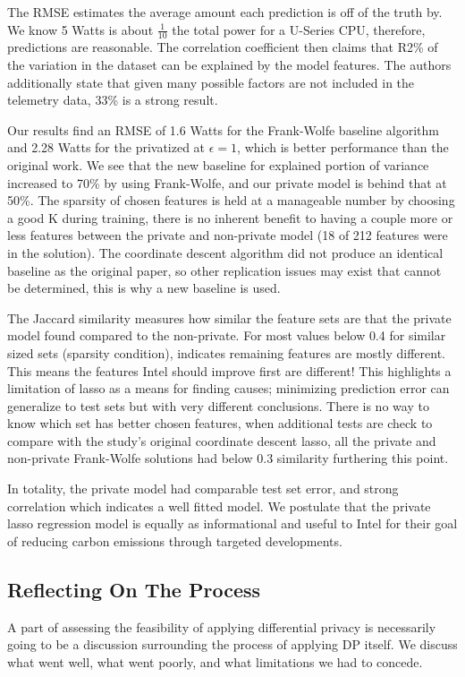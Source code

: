 \documentclass[12pt,letterpaper]{article}
\begin{document}
The RMSE estimates the average amount each prediction is off of the truth by. We know 5 Watts is about $\frac{1}{10}$ the total power for a U-Series CPU, therefore, predictions are reasonable. The correlation coefficient then claims that R2\% of the variation in the dataset can be explained by the model features. The authors additionally state that given many possible factors are not included in the telemetry data, 33\% is a strong result.

Our results find an RMSE of 1.6 Watts for the Frank-Wolfe baseline algorithm and 2.28 Watts for the privatized at $\epsilon=1$, which is better performance than the original work. We see that the new baseline for explained portion of variance increased to 70\% by using Frank-Wolfe, and our private model is behind that at 50\%. The sparsity of chosen features is held at a manageable number by choosing a good K during training, there is no inherent benefit to having a couple more or less features between the private and non-private model (18 of 212 features were in the solution). The coordinate descent algorithm did not produce an identical baseline as the original paper, so other replication issues may exist that cannot be determined, this is why a new baseline is used.

The Jaccard similarity measures how similar the feature sets are that the private model found compared to the non-private. For most values below 0.4 for similar sized sets (sparsity condition), indicates remaining features are mostly different. This means the features Intel should improve first are different! This highlights a limitation of lasso as a means for finding causes; minimizing prediction error can generalize to test sets but with very different conclusions. There is no way to know which set has better chosen features, when additional tests are check to compare with the study’s original coordinate descent lasso, all the private and non-private Frank-Wolfe solutions had below 0.3 similarity furthering this point.

In totality, the private model had comparable test set error, and strong correlation which indicates a well fitted model. We postulate that the private lasso regression model is equally as informational and useful to Intel for their goal of reducing carbon emissions through targeted developments.


\subsection{Reflecting On The Process}
A part of assessing the feasibility of applying differential privacy is necessarily going to be a discussion surrounding the process of applying DP itself. We discuss what went well, what went poorly, and what limitations we had to concede.
\end{document}
